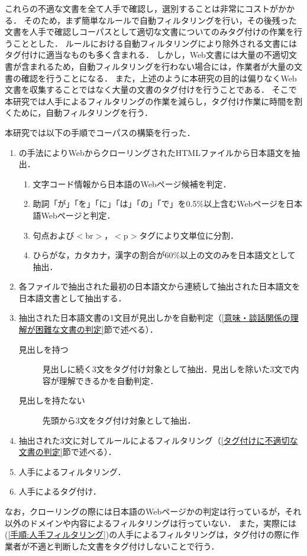 \documentclass[japanese]{jnlp_1.4}
\begin{document}
これらの不適な文書を全て人手で確認し，選別することは非常にコストがかかる．
そのため，まず簡単なルールで自動フィルタリングを行い，その後残った文書を人手で確認しコーパスとして適切な文書についてのみタグ付けの作業を行うこととした．
ルールにおける自動フィルタリングにより除外される文書にはタグ付けに適当なものも多く含まれる．
しかし，Web文書には大量の不適切文書が含まれるため，自動フィルタリングを行わない場合には，作業者が大量の文書の確認を行うことになる．
また，上述のように本研究の目的は偏りなくWeb文書を収集することではなく大量の文書のタグ付けを行うことである．
そこで本研究では人手によるフィルタリングの作業を減らし，タグ付け作業に時間を割くために，自動フィルタリングを行う．


本研究では以下の手順でコーパスの構築を行った．
\begin{enumerate}
\item \cite{Kawahara2006}の手法によりWebからクローリングされたHTMLファイルから日本語文を抽出．
	   \begin{enumerate}
		\item 文字コード情報から日本語のWebページ候補を判定．
		\item 助詞「が」「を」「に」「は」「の」「で」を0.5\%以上含むWebページを日本語Webページと判定．
		\item 句点および$<$br$>$，$<$p$>$タグにより文単位に分割．
		\item ひらがな，カタカナ，漢字の割合が60\%以上の文のみを日本語文として抽出．
	   \end{enumerate}
\item 各ファイルで抽出された最初の日本語文から連続して抽出された日本語文を日本語文書として抽出する．
\item 抽出された日本語文書の1文目が見出しかを自動判定（\ref{意味・談話関係の理解が困難な文書の判定}節で述べる）．
	   \begin{description}
		\item[見出しを持つ] 見出しに続く3文をタグ付け対象として抽出．見出しを除いた3文で内容が理解できるかを自動判定．
		\item[見出しを持たない] 先頭から3文をタグ付け対象として抽出．
	   \end{description}
\item 抽出された3文に対してルールによるフィルタリング（\ref{タグ付けに不適切な文書の判定}節で述べる）．
\item 人手によるフィルタリング．\label{手順:人手フィルタリング}
\item 人手によるタグ付け．\label{手順:人手タグ}
\end{enumerate}
なお，クローリングの際には日本語のWebページかの判定は行っているが，それ以外のドメインや内容によるフィルタリングは行っていない．
また，実際には(\ref{手順:人手フィルタリング})の人手によるフィルタリングは，タグ付けの際に作業者が不適と判断した文書をタグ付けしないことで行う．
\end{document}
